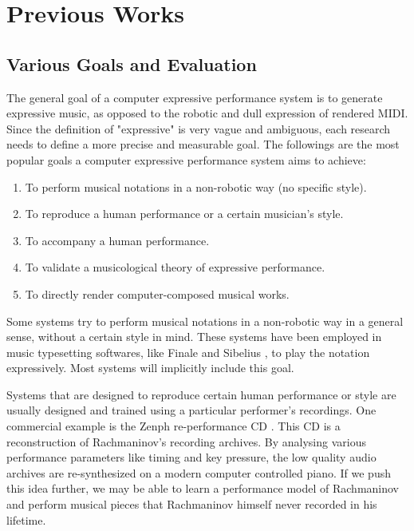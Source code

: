 \chapter{Previous Works}
\label{chap:prev}
\section{Various Goals and Evaluation}
The general goal of a computer expressive performance system is to generate expressive music, as opposed to the robotic and dull expression of rendered MIDI. Since the definition of "expressive" is very vague and ambiguous, each research needs to define a more precise and measurable goal. The followings are the most popular goals a computer expressive performance system aims to achieve:
\begin{enumerate}
   \item To perform musical notations in a non-robotic way (no specific style).
   \item To reproduce a human performance or a certain musician's style.
   \item To accompany a human performance.
   \item To validate a musicological theory of expressive performance.
   \item To directly render computer-composed musical works.
\end{enumerate}

Some systems try to perform musical notations in a non-robotic way in a general sense, without a certain style in mind. These systems have been employed in music typesetting softwares, like Finale \cite{finale} and Sibelius \cite{sibelius}, to play the notation expressively. Most systems will implicitly include this goal.

Systems that are designed to reproduce certain human performance or style are usually designed and trained using a particular performer's recordings. One commercial example is the Zenph re-performance CD \cite{zenph}. This CD is a reconstruction of Rachmaninov's recording archives. By analysing various performance parameters like timing and key pressure, the low quality audio archives are re-synthesized on a modern computer controlled piano. If we push this idea further, we may be able to learn a performance model of Rachmaninov and perform musical pieces that Rachmaninov himself never recorded in his lifetime.%


